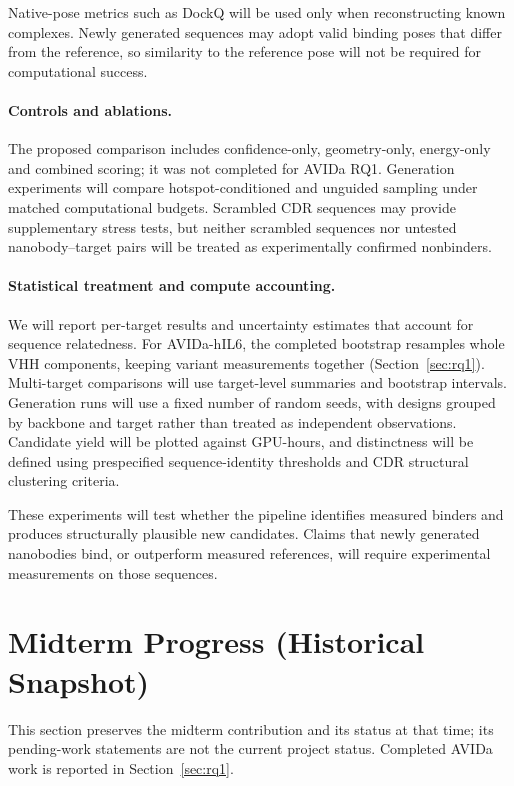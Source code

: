 \documentclass[11pt, logo, nonumbering]{preprint}
\begin{document}
Native-pose metrics such as DockQ will be used only when reconstructing known complexes. Newly generated sequences may adopt valid binding poses that differ from the reference, so similarity to the reference pose will not be required for computational success.

\paragraph{Controls and ablations.}
The proposed comparison includes confidence-only, geometry-only, energy-only and combined scoring; it was not completed for AVIDa RQ1. Generation experiments will compare hotspot-conditioned and unguided sampling under matched computational budgets. Scrambled CDR sequences may provide supplementary stress tests, but neither scrambled sequences nor untested nanobody--target pairs will be treated as experimentally confirmed nonbinders.

\paragraph{Statistical treatment and compute accounting.}
We will report per-target results and uncertainty estimates that account for sequence relatedness. For AVIDa-hIL6, the completed bootstrap resamples whole VHH components, keeping variant measurements together (Section~\ref{sec:rq1}). Multi-target comparisons will use target-level summaries and bootstrap intervals. Generation runs will use a fixed number of random seeds, with designs grouped by backbone and target rather than treated as independent observations. Candidate yield will be plotted against GPU-hours, and distinctness will be defined using prespecified sequence-identity thresholds and CDR structural clustering criteria.

\noindent These experiments will test whether the pipeline identifies measured binders and produces structurally plausible new candidates. Claims that newly generated nanobodies bind, or outperform measured references, will require experimental measurements on those sequences.

\section{Midterm Progress (Historical Snapshot)}
\label{sec:midterm}
This section preserves the midterm contribution and its status at that time;
its pending-work statements are not the current project status. Completed
AVIDa work is reported in Section~\ref{sec:rq1}.
\end{document}
